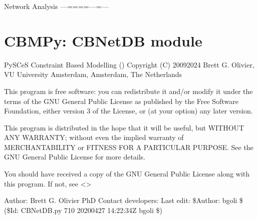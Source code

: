\documentclass[letterpaper,12pt,english]{sphinxmanual}
\begin{document}
\sphinxstepscope

\sphinxAtStartPar
Network Analysis
—=\sphinxhyphen{}=\textendash{}=\sphinxhyphen{}=—=—

\section{CBMPy: CBNetDB module}
\label{\detokenize{api/networking:cbmpy-cbnetdb-module}}\label{\detokenize{api/networking:module-cbmpy.CBNetDB}}\label{\detokenize{api/networking::doc}}
\sphinxAtStartPar
PySCeS Constraint Based Modelling ()
Copyright (C) 2009\sphinxhyphen{}2024 Brett G. Olivier, VU University Amsterdam, Amsterdam, The Netherlands

\sphinxAtStartPar
This program is free software: you can redistribute it and/or modify
it under the terms of the GNU General Public License as published by
the Free Software Foundation, either version 3 of the License, or
(at your option) any later version.

\sphinxAtStartPar
This program is distributed in the hope that it will be useful,
but WITHOUT ANY WARRANTY; without even the implied warranty of
MERCHANTABILITY or FITNESS FOR A PARTICULAR PURPOSE.  See the
GNU General Public License for more details.

\sphinxAtStartPar
You should have received a copy of the GNU General Public License
along with this program.  If not, see \textless{}\textgreater{}

\sphinxAtStartPar
Author: Brett G. Olivier PhD
Contact developers: 
Last edit: \$Author: bgoli \$ (\$Id: CBNetDB.py 710 2020\sphinxhyphen{}04\sphinxhyphen{}27 14:22:34Z bgoli \$)
\end{document}
